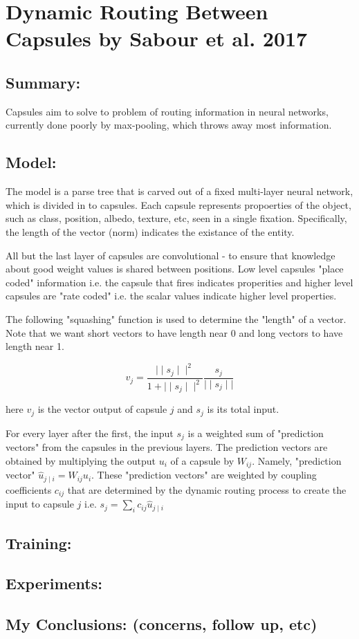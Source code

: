 \section{Dynamic Routing Between Capsules by Sabour et al. 2017}

\subsection{Summary:}
Capsules aim to solve to problem of routing information in neural networks, currently done
poorly by max-pooling, which throws away most information.

\subsection{Model:}

The model is a parse tree that is carved out of a fixed multi-layer neural network, which is divided in to capsules.
Each capsule represents propoerties of the object, such as class, position, albedo, texture, etc, seen in a single fixation.
Specifically, the length of the vector (norm) indicates the existance of the entity. 

All but the last layer of capsules are convolutional - to ensure that knowledge about good weight values is shared
between positions. Low level capsules "place coded" information i.e. the capsule that fires indicates properities and
higher level capsules are "rate coded" i.e. the scalar values indicate higher level properties. 

The following "squashing" function is used to determine the "length" of a vector. Note that we want
short vectors to have length near 0 and long vectors to have length near 1.

$$v_j = \frac{\mid \mid s_j \mid \mid^2}{1 + \mid \mid s_j \mid \mid^2}\frac{s_j}{\mid \mid s_j \mid \mid}$$

here $v_j$ is the vector output of capsule $j$ and $s_j$ is its total input.

For every layer after the first, the input $s_j$ is a weighted sum of "prediction vectors" from the capsules in the 
previous layers. The prediction vectors are obtained by multiplying the output $u_i$ of a capsule by $W_{ij}$.
Namely, "prediction vector" $\hat u_{j \mid i} = W_{ij} u_i$. These "prediction vectors" are weighted by 
coupling coefficients $c_{ij}$ that are determined by the dynamic routing process to create the input to capsule $j$ i.e.
$s_j = \sum_{i} c_{ij}\hat u_{j \mid i}$

\subsection{Training:}

\subsection{Experiments:}

\subsection{My Conclusions: (concerns, follow up, etc)}

